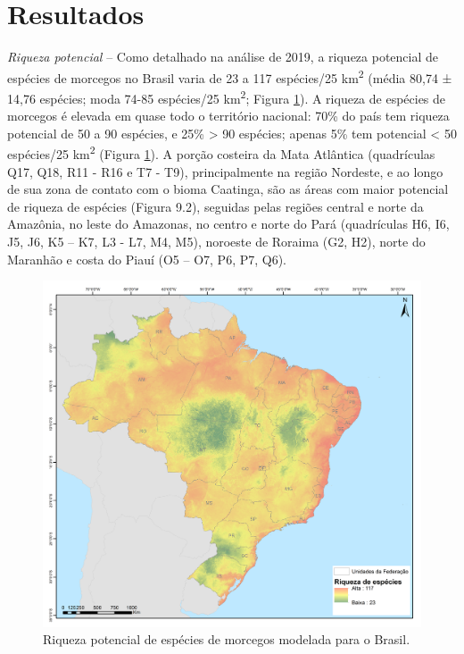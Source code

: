 \documentclass[
  oneside]{scrbook}
\begin{document}
\hypertarget{resultados-2}{%
\section{Resultados}\label{resultados-2}}

\emph{Riqueza potencial} -- Como detalhado na análise de 2019, a riqueza potencial de espécies de morcegos no Brasil varia de 23 a 117 espécies/25 km\textsuperscript{2} (média 80,74 ± 14,76 espécies; moda 74-85 espécies/25 km\textsuperscript{2}; Figura \ref{fig:67}). A riqueza de espécies de morcegos é elevada em quase todo o território nacional: 70\% do país tem riqueza potencial de 50 a 90 espécies, e 25\% \textgreater{} 90 espécies; apenas 5\% tem potencial \textless{} 50 espécies/25 km\textsuperscript{2} (Figura \ref{fig:67}). A porção costeira da Mata Atlântica (quadrículas Q17, Q18, R11 - R16 e T7 - T9), principalmente na região Nordeste, e ao longo de sua zona de contato com o bioma Caatinga, são as áreas com maior potencial de riqueza de espécies (Figura 9.2), seguidas pelas regiões central e norte da Amazônia, no leste do Amazonas, no centro e norte do Pará (quadrículas H6, I6, J5, J6, K5 -- K7, L3 - L7, M4, M5), noroeste de Roraima (G2, H2), norte do Maranhão e costa do Piauí (O5 -- O7, P6, P7, Q6).

\begin{figure}[H]

{\centering \includegraphics[width=0.75\linewidth]{imagens/cap09/Figura_9.1} 

}

\caption{Riqueza potencial de espécies de morcegos modelada para o Brasil.}\label{fig:67}
\end{figure}
\end{document}
